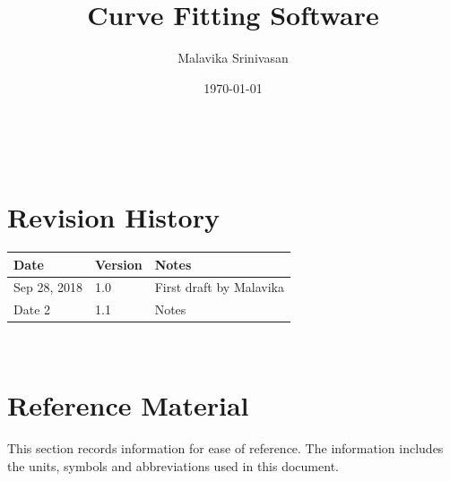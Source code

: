 \documentclass[12pt]{article}
\begin{document}
\title{Curve Fitting Software} 
\author{Malavika Srinivasan}
\date{\today}

\maketitle

~\newpage


\section{Revision History}

\begin{tabularx}{\textwidth}{p{3cm}p{2cm}X}
\toprule {\bf Date} & {\bf Version} & {\bf Notes}\\
\midrule
Sep 28, 2018 & 1.0 & First draft by Malavika\\
Date 2 & 1.1 & Notes\\
\bottomrule
\end{tabularx}

~\newpage
	
\section{Reference Material}

This section records information for ease of reference. The information includes the units, symbols and abbreviations used in this document.
\end{document}
